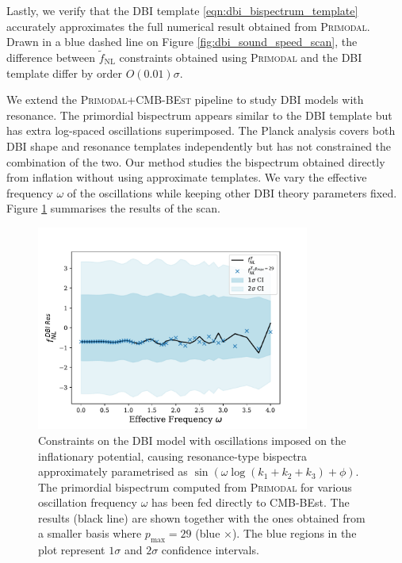 Lastly, we verify that the DBI template \eqref{eqn:dbi_bispectrum_template} accurately approximates the full numerical result obtained from \textsc{Primodal}. Drawn in a blue dashed line on Figure \ref{fig:dbi_sound_speed_scan}, the difference between $\tilde{f}_\text{NL}$ constraints obtained using \textsc{Primodal} and the DBI template differ by order $O(0.01)\sigma$.

\bigskip

We extend the \textsc{Primodal}+\textsc{CMB-BEst} pipeline to study DBI models with resonance. The primordial bispectrum appears similar to the DBI template but has extra log-spaced oscillations superimposed. The Planck analysis covers both DBI shape and resonance templates independently but has not constrained the combination of the two. Our method studies the bispectrum obtained directly from inflation without using approximate templates. We vary the effective frequency $\omega$ of the oscillations while keeping other DBI theory parameters fixed. Figure \ref{fig:dbi_resonance_scan} summarises the results of the scan.

\begin{figure}[htbp!] 
	\centering    
	\includegraphics[width=0.8\textwidth]{dbi_reso_scan_fNLs_new.pdf}
	\caption{Constraints on the DBI model with oscillations imposed on the inflationary potential, causing resonance-type bispectra approximately parametrised as $\sin(\omega \log(k_1+k_2+k_3) + \phi)$. The primordial bispectrum computed from \textsc{Primodal} for various oscillation frequency $\omega$ has been fed directly to CMB-BEst. The results (black line) are shown together with the ones obtained from a smaller basis where $p_\text{max}=29$ (blue $\times$). The blue regions in the plot represent $1\sigma$ and $2\sigma$ confidence intervals.}
	\label{fig:dbi_resonance_scan}
\end{figure}

